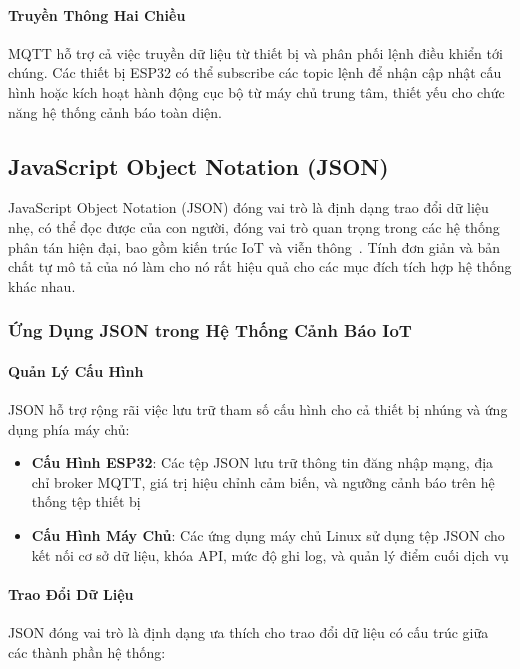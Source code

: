 \paragraph{Truyền Thông Hai Chiều}
MQTT hỗ trợ cả việc truyền dữ liệu từ thiết bị và phân phối lệnh điều khiển tới chúng. Các thiết bị ESP32 có thể subscribe các topic lệnh để nhận cập nhật cấu hình hoặc kích hoạt hành động cục bộ từ máy chủ trung tâm, thiết yếu cho chức năng hệ thống cảnh báo toàn diện.

\subsection{JavaScript Object Notation (JSON)}
\label{subsec:json_format}

JavaScript Object Notation (JSON) đóng vai trò là định dạng trao đổi dữ liệu nhẹ, có thể đọc được của con người, đóng vai trò quan trọng trong các hệ thống phân tán hiện đại, bao gồm kiến trúc IoT và viễn thông~\cite{json_rfc7159}. Tính đơn giản và bản chất tự mô tả của nó làm cho nó rất hiệu quả cho các mục đích tích hợp hệ thống khác nhau.

\subsubsection{Ứng Dụng JSON trong Hệ Thống Cảnh Báo IoT}
\label{subsubsec:json_applications}

\paragraph{Quản Lý Cấu Hình}
JSON hỗ trợ rộng rãi việc lưu trữ tham số cấu hình cho cả thiết bị nhúng và ứng dụng phía máy chủ:

\begin{itemize}
    \item \textbf{Cấu Hình ESP32}: Các tệp JSON lưu trữ thông tin đăng nhập mạng, địa chỉ broker MQTT, giá trị hiệu chỉnh cảm biến, và ngưỡng cảnh báo trên hệ thống tệp thiết bị
    \item \textbf{Cấu Hình Máy Chủ}: Các ứng dụng máy chủ Linux sử dụng tệp JSON cho kết nối cơ sở dữ liệu, khóa API, mức độ ghi log, và quản lý điểm cuối dịch vụ
\end{itemize}

\paragraph{Trao Đổi Dữ Liệu}
JSON đóng vai trò là định dạng ưa thích cho trao đổi dữ liệu có cấu trúc giữa các thành phần hệ thống:

